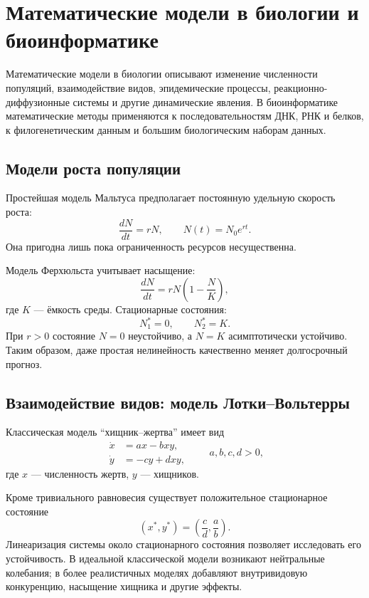 \section{Математические модели в биологии и биоинформатике}
\label{sec:models-in-biology-and-bioinformatics}

Математические модели в биологии описывают изменение численности
популяций, взаимодействие видов, эпидемические процессы, реакционно-
диффузионные системы и другие динамические явления. В биоинформатике
математические методы применяются к последовательностям ДНК, РНК и белков,
к филогенетическим данным и большим биологическим наборам данных.

\subsection{Модели роста популяции}

Простейшая модель Мальтуса предполагает постоянную удельную скорость роста:
\[
\boxed{\frac{dN}{dt}=rN},
\qquad
N(t)=N_0e^{rt}.
\]
Она пригодна лишь пока ограниченность ресурсов несущественна.

Модель Ферхюльста учитывает насыщение:
\[
\boxed{
\frac{dN}{dt}=rN\left(1-\frac{N}{K}\right),
}
\]
где $K$ --- ёмкость среды. Стационарные состояния:
\[
N_1^*=0,
\qquad
N_2^*=K.
\]
При $r>0$ состояние $N=0$ неустойчиво, а $N=K$ асимптотически устойчиво.
Таким образом, даже простая нелинейность качественно меняет долгосрочный
прогноз.

\subsection{Взаимодействие видов: модель Лотки--Вольтерры}

Классическая модель ``хищник--жертва'' имеет вид
\[
\boxed{
\begin{aligned}
\dot x&=ax-bxy,\\
\dot y&=-cy+dxy,
\end{aligned}
}
\qquad a,b,c,d>0,
\]
где $x$ --- численность жертв, $y$ --- хищников.

Кроме тривиального равновесия существует положительное стационарное
состояние
\[
\boxed{
(x^*,y^*)=\left(\frac{c}{d},\frac{a}{b}\right).
}
\]
Линеаризация системы около стационарного состояния позволяет исследовать
его устойчивость. В идеальной классической модели возникают нейтральные
колебания; в более реалистичных моделях добавляют внутривидовую
конкуренцию, насыщение хищника и другие эффекты.

